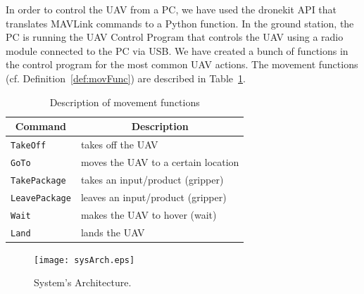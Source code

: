 \documentclass[conference]{IEEEtran}
\begin{document}
In order to control the UAV from a PC, we have used the dronekit API that translates MAVLink commands to a Python function. In the ground station, the PC is running the UAV Control Program that controls the UAV using a radio module connected to the PC via USB. We have created a bunch of functions in the control program for the most common UAV actions. The movement functions (cf. Definition~\ref{def:movFunc}) are described in Table~\ref{table:movfunc}.
%

\begin{table}[]
\scriptsize
\centering
\begin{tabular}{|l|l|}
\hline
\multicolumn{1}{|c|}{\textbf{Command}} & \multicolumn{1}{c|}{\textbf{Description}}           \\ \hline
\texttt{TakeOff}                     & takes off the UAV                                   \\ \hline
\texttt{GoTo}                        & moves the UAV to a certain location                 \\ \hline
\texttt{TakePackage}                 & takes an input/product (gripper) \\ \hline
\texttt{LeavePackage}                & leaves an input/product (gripper)   \\ \hline
\texttt{Wait}                        & makes the UAV to hover (wait)                       \\ \hline
\texttt{Land}                        & lands the UAV                                       \\ \hline
\end{tabular}
\caption{Description of movement functions}
\label{table:movfunc}
\end{table}


\begin{figure}[H]
	\centering
	\texttt{[image: sysArch.eps]}
	\caption{System's Architecture.\label{fig:sysArch}}
\end{figure}
\end{document}
